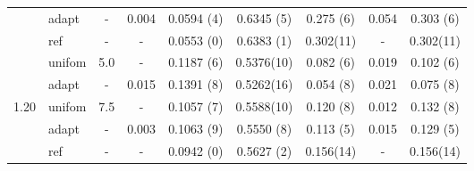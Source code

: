 \documentclass[aps,pre,preprint,unsortedaddress]{revtex4}
\begin{document}
\begin{table}
\begin{tabular*}{0.95\textwidth}{@{\extracolsep{\fill}}c|l|ccccccc}
    & \textrm{adapt}  & -       & 0.004   & 0.0594 (4) & 0.6345 (5) & 0.275 (6) & 0.054 & 0.303 (6) \\
    & \textrm{ref}    & -       & -       & 0.0553 (0) & 0.6383 (1) & 0.302(11) & -     & 0.302(11) \\    \hline
    & \textrm{unifom} & 5.0     & -       & 0.1187 (6) & 0.5376(10) & 0.082 (6) & 0.019 & 0.102 (6) \\
    & \textrm{adapt}  & -       & 0.015   & 0.1391 (8) & 0.5262(16) & 0.054 (8) & 0.021 & 0.075 (8) \\
1.20& \textrm{unifom} & 7.5     & -       & 0.1057 (7) & 0.5588(10) & 0.120 (8) & 0.012 & 0.132 (8) \\
    & \textrm{adapt}  & -       & 0.003   & 0.1063 (9) & 0.5550 (8) & 0.113 (5) & 0.015 & 0.129 (5) \\
    & \textrm{ref}    & -       & -       & 0.0942 (0) & 0.5627 (2) & 0.156(14) & -     & 0.156(14) \\    \hline    \hline    
  \end{tabular*}
\end{table}



% 
\end{document}
